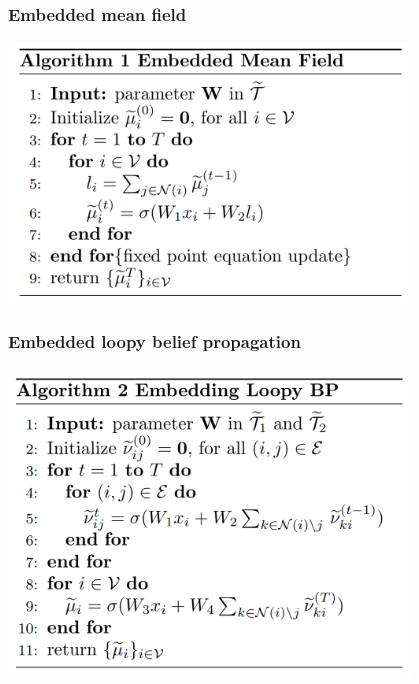 \documentclass{beamer}
\begin{document}
%

    \begin{frame}
        \frametitle{Embedded mean field}
        \begin{center}
            \includegraphics[width=0.8\textwidth]{emf.png}
        \end{center}
    \end{frame}

    \begin{frame}
        \frametitle{Embedded loopy belief propagation}
        \begin{center}
            \includegraphics[width=0.8\textwidth]{elbp.png}
        \end{center}
    \end{frame}
\end{document}
